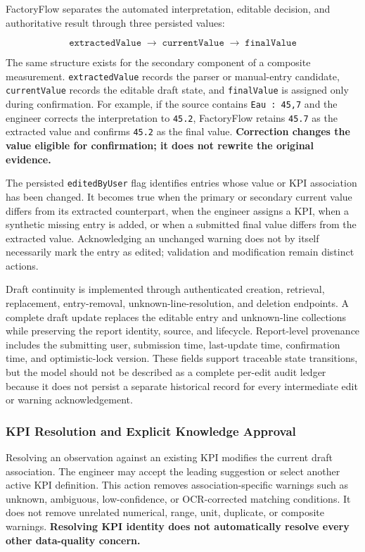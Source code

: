 FactoryFlow separates the automated interpretation, editable decision, and authoritative result through three persisted values:

\[
\texttt{extractedValue}
\;\longrightarrow\;
\texttt{currentValue}
\;\longrightarrow\;
\texttt{finalValue}
\]

The same structure exists for the secondary component of a composite measurement. \texttt{extractedValue} records the parser or manual-entry candidate, \texttt{currentValue} records the editable draft state, and \texttt{finalValue} is assigned only during confirmation. For example, if the source contains \texttt{Eau : 45,7} and the engineer corrects the interpretation to \texttt{45.2}, FactoryFlow retains \texttt{45.7} as the extracted value and confirms \texttt{45.2} as the final value. \textbf{Correction changes the value eligible for confirmation; it does not rewrite the original evidence.}

The persisted \texttt{editedByUser} flag identifies entries whose value or KPI association has been changed. It becomes true when the primary or secondary current value differs from its extracted counterpart, when the engineer assigns a KPI, when a synthetic missing entry is added, or when a submitted final value differs from the extracted value. Acknowledging an unchanged warning does not by itself necessarily mark the entry as edited; validation and modification remain distinct actions.

Draft continuity is implemented through authenticated creation, retrieval, replacement, entry-removal, unknown-line-resolution, and deletion endpoints. A complete draft update replaces the editable entry and unknown-line collections while preserving the report identity, source, and lifecycle. Report-level provenance includes the submitting user, submission time, last-update time, confirmation time, and optimistic-lock version. These fields support traceable state transitions, but the model should not be described as a complete per-edit audit ledger because it does not persist a separate historical record for every intermediate edit or warning acknowledgement.

\subsubsection{KPI Resolution and Explicit Knowledge Approval}

Resolving an observation against an existing KPI modifies the current draft association. The engineer may accept the leading suggestion or select another active KPI definition. This action removes association-specific warnings such as unknown, ambiguous, low-confidence, or OCR-corrected matching conditions. It does not remove unrelated numerical, range, unit, duplicate, or composite warnings. \textbf{Resolving KPI identity does not automatically resolve every other data-quality concern.}

